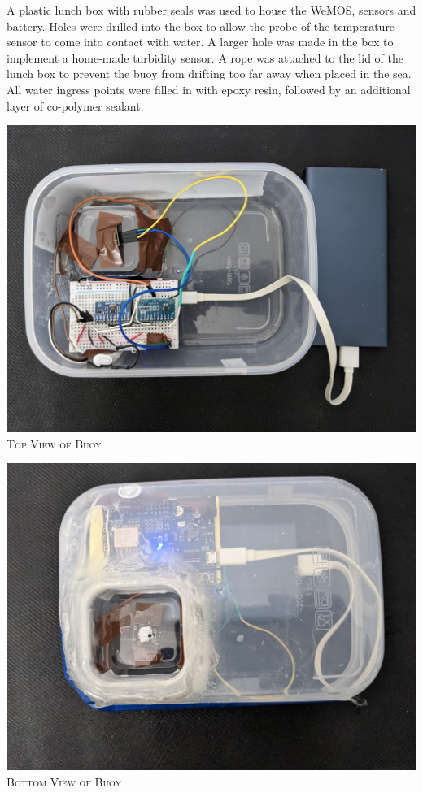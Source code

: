 \documentclass{article}
\begin{document}
\begin{multicols}{2}
A plastic lunch box with rubber seals was used to house the WeMOS, sensors and battery. Holes were drilled into the box to allow the probe of the temperature sensor to come into contact with water. A larger hole was made in the box to implement a home-made turbidity sensor. A rope was attached to the lid of the lunch box to prevent the buoy from drifting too far away when placed in the sea. All water ingress points were filled in with epoxy resin, followed by an additional layer of co-polymer sealant. 

\begin{center}
 \includegraphics[width=\columnwidth]{report/images/buoy-top-view.jpg}\\
 \textsc{Top View of Buoy}
 
 \columnbreak
 \includegraphics[width=\columnwidth]{report/images/buoy-bottom-view.jpg}\\
 \textsc{Bottom View of Buoy}
 

\end{center}
\end{multicols}
\end{document}
